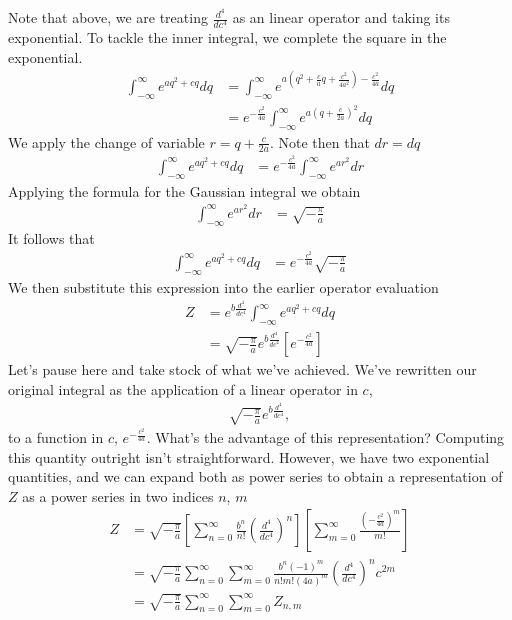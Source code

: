 \documentclass[book.tex]{subfiles}
\begin{document}
Note that above, we are treating $\frac{d^4}{dc^4}$ as an linear operator and taking its exponential. To tackle the inner integral, we complete the square in the exponential.
\begin{align}
    \int_{-\infty}^{\infty} e^{aq^2 + cq} dq &= \int_{-\infty}^{\infty} e^{a\left (q^2 + \frac{c}{a}q + \frac{c^2}{4a^2}\right ) - \frac{c^2}{4a}} dq \\
    &= e^{-\frac{c^2}{4a}}\int_{-\infty}^\infty e^{a\left (q + \frac{c}{2a}\right )^2 } dq
\end{align}
We apply the change of variable $r = q + \frac{c}{2a}$. Note then that $dr = dq$
\begin{align}
    \int_{-\infty}^{\infty} e^{aq^2 + cq} dq &=
    e^{-\frac{c^2}{4a}} \int_{-\infty}^{\infty} e^{ar^2} dr
\end{align}
Applying the formula for the Gaussian integral we obtain
\begin{align}
    \int_{-\infty}^{\infty} e^{ar^2} dr &= \sqrt{-\frac{\pi}{a}}
\end{align}
It follows that
\begin{align}
    \int_{-\infty}^{\infty} e^{aq^2 + cq} dq &= e^{-\frac{c^2}{4a}} \sqrt{-\frac{\pi}{a}}
\end{align}
We then substitute this expression into the earlier operator evaluation
\begin{align}
    Z &= e^{b \frac{d^4}{dc^4}} \int_{-\infty}^{\infty} e^{aq^2 + cq} dq \\
    &= \sqrt{-\frac{\pi}{a}} e^{b \frac{d^4}{dc^4}} \left [ e^{-\frac{c^2}{4a}}  \right ]
\end{align}
Let's pause here and take stock of what we've achieved. We've rewritten our original integral as the application of a linear operator in $c$, \begin{align}
\sqrt{-\frac{\pi}{a}}e^{b\frac{d^4}{dc^4}},
\end{align} to a function in $c$, $e^{-\frac{c^2}{4a}}$. What's the advantage of this representation? Computing this quantity outright isn't straightforward. However, we have two exponential quantities, and we can expand both as power series to obtain a representation of $Z$ as a power series in two indices $n$, $m$
\begin{align}
    Z &= \sqrt{-\frac{\pi}{a}} \left [ \sum_{n=0}^{\infty} \frac{b^n}{n!} \left ( \frac{d^4}{dc^4} \right )^n \right ] \left [
     \sum_{m=0}^\infty \frac{\left(-\frac{c^2}{4a} \right )^m}{m!} \right ] \\
     &= \sqrt{-\frac{\pi}{a}} \sum_{n=0}^\infty \sum_{m=0}^\infty \frac{b^n(-1)^m}{n!m!(4a)^m} \left ( \frac{d^4}{dc^4}\right )^n c^{2m} \\
     &= \sqrt{-\frac{\pi}{a}} \sum_{n=0}^{\infty} \sum_{m=0}^{\infty} Z_{n,m}
\end{align}
\end{document}
